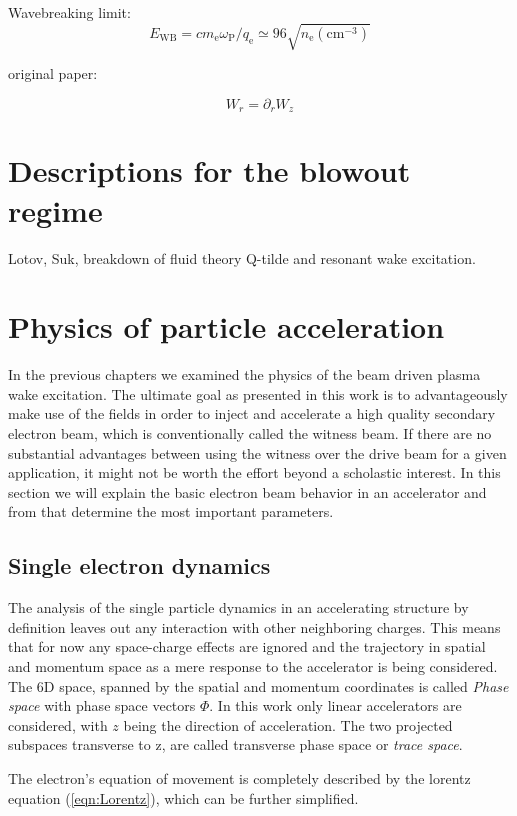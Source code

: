 Wavebreaking limit: \begin{equation}
E_\mathrm{WB}=cm_\mathrm{e}\omega_\mathrm{P}/q_\mathrm{e}\simeq 96 \sqrt{n_\mathrm{e}(\mathrm{cm}^{-3})}
\end{equation}


original paper:  \cite{Panowsky_Wenzel_original}

 \begin{equation}
W_r =\partial_r W_z
\end{equation} 
\section{Descriptions for the blowout regime}
Lotov, Suk, breakdown of fluid theory
Q-tilde and resonant wake excitation.


\section{Physics of particle acceleration}
In the previous chapters we examined the physics of the beam driven plasma wake excitation. 
The ultimate goal as presented in this work is to advantageously make use of the fields in order to inject and accelerate a high quality secondary electron beam, which is conventionally called the witness beam. If there are no substantial advantages between  using the witness over the drive beam for a given application, it might not be worth the effort beyond a scholastic interest.
In this section we will explain the basic electron beam behavior in an accelerator and from that determine the most important parameters. 
\subsection{Single electron dynamics}
The analysis of the single particle dynamics in an accelerating structure by definition leaves out any interaction with other neighboring charges. This means that for now any space-charge effects are ignored and the trajectory in spatial and momentum space as a mere response to the accelerator is being considered. The 6D space, spanned by the spatial and momentum coordinates is called \textit{Phase space} with phase space vectors $\Phi$. 
In this work only linear accelerators are considered, with $z$ being the direction of acceleration. 
The two projected subspaces transverse to z, are called transverse phase space or \textit{trace space}.

The electron's equation of movement is completely described by the lorentz equation (\ref{eqn:Lorentz}), which can be further simplified.

